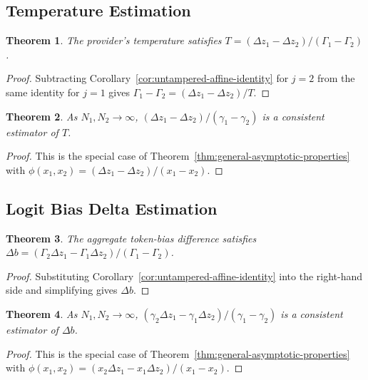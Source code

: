 \documentclass{article}
\newtheorem{theorem}{Theorem}
\begin{document}
\subsection{Temperature Estimation}

\begin{theorem}
\label{thm:temperature-recovery}
The provider's temperature satisfies
$T=(\Delta z_1-\Delta z_2)/(\Gamma_1-\Gamma_2)$.
\end{theorem}
\begin{proof}
Subtracting Corollary~\ref{cor:untampered-affine-identity} for $j=2$ from the
same identity for $j=1$ gives
$\Gamma_1-\Gamma_2=(\Delta z_1-\Delta z_2)/T$.
\end{proof}

\begin{theorem}
\label{thm:temperature-estimator}
As $N_1,N_2\to\infty$,
$(\Delta z_1-\Delta z_2)/(\gamma_1-\gamma_2)$ is a consistent estimator of $T$.
\end{theorem}
\begin{proof}
This is the special case of Theorem~\ref{thm:general-asymptotic-properties}
with $\phi(x_1,x_2)=(\Delta z_1-\Delta z_2)/(x_1-x_2)$.
\end{proof}

\subsection{Logit Bias Delta Estimation}

\begin{theorem}
\label{thm:bias-recovery}
The aggregate token-bias difference satisfies
$\Delta b=(\Gamma_2\Delta z_1-\Gamma_1\Delta z_2)/(\Gamma_1-\Gamma_2)$.
\end{theorem}
\begin{proof}
Substituting Corollary~\ref{cor:untampered-affine-identity} into the right-hand
side and simplifying gives $\Delta b$.
\end{proof}

\begin{theorem}
\label{thm:bias-estimator}
As $N_1,N_2\to\infty$,
$(\gamma_2\Delta z_1-\gamma_1\Delta z_2)/(\gamma_1-\gamma_2)$ is a consistent
estimator of $\Delta b$.
\end{theorem}
\begin{proof}
This is the special case of Theorem~\ref{thm:general-asymptotic-properties}
with $\phi(x_1,x_2)=(x_2\Delta z_1-x_1\Delta z_2)/(x_1-x_2)$.
\end{proof}
\end{document}
